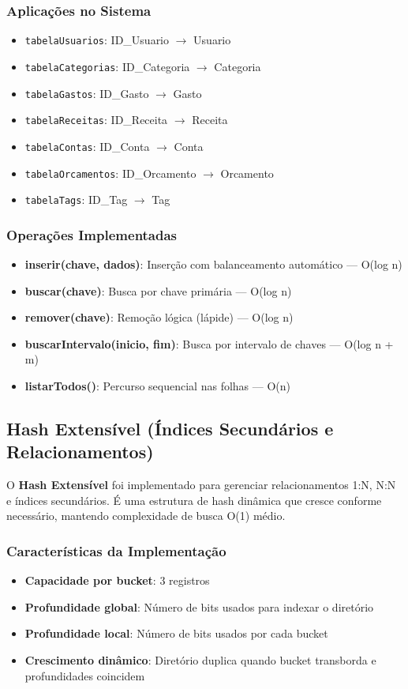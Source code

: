 \documentclass[12pt,a4paper]{article}
\begin{document}
\subsubsection*{Aplicações no Sistema}
\begin{itemize}
  \item \texttt{tabelaUsuarios}: ID\_Usuario $\rightarrow$ Usuario
  \item \texttt{tabelaCategorias}: ID\_Categoria $\rightarrow$ Categoria
  \item \texttt{tabelaGastos}: ID\_Gasto $\rightarrow$ Gasto
  \item \texttt{tabelaReceitas}: ID\_Receita $\rightarrow$ Receita
  \item \texttt{tabelaContas}: ID\_Conta $\rightarrow$ Conta
  \item \texttt{tabelaOrcamentos}: ID\_Orcamento $\rightarrow$ Orcamento
  \item \texttt{tabelaTags}: ID\_Tag $\rightarrow$ Tag
\end{itemize}

\subsubsection*{Operações Implementadas}
\begin{itemize}
  \item \textbf{inserir(chave, dados)}: Inserção com balanceamento automático — O(log n)
  \item \textbf{buscar(chave)}: Busca por chave primária — O(log n)
  \item \textbf{remover(chave)}: Remoção lógica (lápide) — O(log n)
  \item \textbf{buscarIntervalo(inicio, fim)}: Busca por intervalo de chaves — O(log n + m)
  \item \textbf{listarTodos()}: Percurso sequencial nas folhas — O(n)
\end{itemize}

\subsection{Hash Extensível (Índices Secundários e Relacionamentos)}

O \textbf{Hash Extensível} foi implementado para gerenciar relacionamentos 1:N, N:N e índices secundários.
É uma estrutura de hash dinâmica que cresce conforme necessário, mantendo complexidade de busca O(1) médio.

\subsubsection*{Características da Implementação}
\begin{itemize}
  \item \textbf{Capacidade por bucket}: 3 registros
  \item \textbf{Profundidade global}: Número de bits usados para indexar o diretório
  \item \textbf{Profundidade local}: Número de bits usados por cada bucket
  \item \textbf{Crescimento dinâmico}: Diretório duplica quando bucket transborda e profundidades coincidem
\end{itemize}
\end{document}
